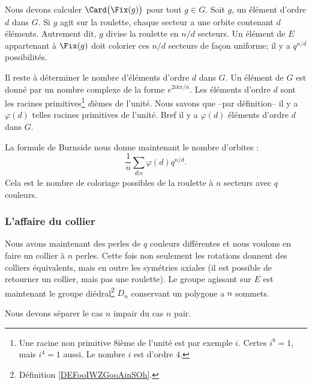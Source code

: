 Nous devons calculer \( \Card\big( \Fix(g) \big)\) pour tout \( g\in G\). Soit \( g\), un élément d'ordre \( d\) dans \( G\). Si \( g\) agit sur la roulette, chaque secteur a une orbite contenant \( d\) éléments. Autrement dit, \( g\) divise la roulette en \( n/d\) secteurs. Un élément de \( E\) appartenant à \( \Fix(g)\) doit colorier ces \( n/d\) secteurs de façon uniforme; il y a \( q^{n/d}\) possibilités.

Il reste à déterminer le nombre d'éléments d'ordre \( d\) dans \( G\). Un élément de \( G\) est donné par un nombre complexe de la forme \(  e^{2ik\pi/n}\). Les éléments d'ordre \( d\) sont les racines primitives\footnote{Une racine non primitive \( 8\)ième de l'unité est par exemple \( i\). Certes \( i^8=1\), mais \( i^4=1\) aussi. Le nombre \( i\) est d'ordre \( 4\).} \( d\)ièmes de l'unité. Nous savons que --par définition-- il y a \( \varphi(d)\) telles racines primitives de l'unité. Bref il y a \( \varphi(d)\) éléments d'ordre \( d\) dans \( G\). 

La formule de Burnside nous donne maintenant le nombre d'orbites :
\begin{equation}
    \frac{1}{ n }\sum_{d|n}\varphi(d)q^{n/d}.
\end{equation}
Cela est le nombre de coloriage possibles de la roulette à \( n\) secteurs avec \( q\) couleurs.

\subsubsection{L'affaire du collier}
\label{siOQlG}

Nous avons maintenant des perles de \( q\) couleurs différentes et nous voulons en faire un collier à \( n\) perles. Cette fois non seulement les rotations donnent des colliers équivalents, mais en outre les symétries axiales (il est possible de retourner un collier, mais pas une roulette). Le groupe agissant sur \( E\) est maintenant le groupe diédral\footnote{Définition \ref{DEFooIWZGooAinSOh}.} \( D_n\) conservant un polygone a \( n\) sommets.

Nous devons séparer le cas \( n\) impair du cas \( n\) pair.

